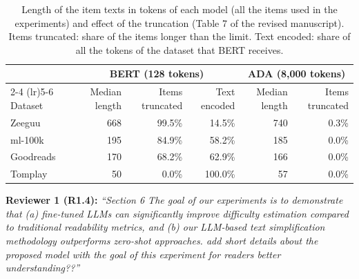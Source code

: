 \documentclass[11pt,a4paper]{article}
\newcommand{\mm}[1]{#1}
\begin{document}
\begin{table}[!htbp]
\centering
\scriptsize
\color{maximecolor}
\caption{\mm{Length of the item texts in tokens of each model (all the items used in the experiments) and effect of the truncation (Table 7 of the revised manuscript). Items truncated: share of the items longer than the limit. Text encoded: share of all the tokens of the dataset that BERT receives.}}
\label{tab:rebuttal_token_lengths}
\begin{tabular}{lrrrrr}
\toprule
 & \multicolumn{3}{c}{BERT (128 tokens)} & \multicolumn{2}{c}{ADA (8,000 tokens)} \\
\cmidrule(lr){2-4} \cmidrule(lr){5-6}
Dataset & Median length & Items truncated & Text encoded & Median length & Items truncated \\
\midrule
Zeeguu & 668 & 99.5\% & 14.5\% & 740 & 0.3\% \\
ml-100k & 195 & 84.9\% & 58.2\% & 185 & 0.0\% \\
Goodreads & 170 & 68.2\% & 62.9\% & 166 & 0.0\% \\
Tomplay & 50 & 0.0\% & 100.0\% & 57 & 0.0\% \\
\bottomrule
\end{tabular}
\end{table}

\begin{reviewbox}
\textbf{Reviewer 1 (R1.4):} \textit{``Section 6 The goal of our experiments is to demonstrate that (a) fine-tuned LLMs can significantly improve difficulty estimation compared to traditional readability metrics, and (b) our LLM-based text simplification methodology outperforms zero-shot approaches. add short details about the proposed model with the goal of this experiment for readers better understanding??''}
\end{reviewbox}
\end{document}
